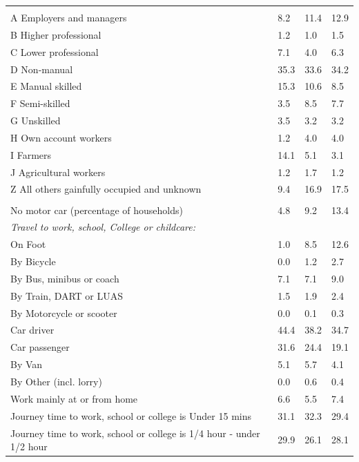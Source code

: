 \documentclass{article}
\begin{document}
\begin{table}[h]
\begin{tabular}{KTTT}
\hline
    \\ 
    \hline
A Employers and managers &  8.2& 11.4& 12.9\\
B Higher professional & 1.2& 1.0& 1.5\\
C Lower professional & 7.1& 4.0& 6.3\\
D Non-manual & 35.3& 33.6& 34.2\\
E Manual skilled & 15.3& 10.6&  8.5\\
F Semi-skilled & 3.5& 8.5& 7.7\\
G Unskilled & 3.5& 3.2& 3.2\\
H Own account workers & 1.2& 4.0& 4.0\\
I Farmers & 14.1&  5.1&  3.1\\
J Agricultural workers & 1.2& 1.7& 1.2\\
Z All others gainfully occupied and unknown &  9.4& 16.9& 17.5\\
\hline
{}\hline
    \\ 
    \hline
No motor car (percentage of households) &  4.8&  9.2& 
13.4\\
    \hline
\emph{Travel to work, school, College or childcare:} & & & \\
\quad On Foot &  1.0&  8.5& 12.6\\
\quad By Bicycle & 0.0& 1.2& 2.7\\
\quad By Bus, minibus or coach & 7.1& 7.1& 9.0\\
\quad By Train, DART or LUAS & 1.5& 1.9& 2.4\\
\quad By Motorcycle or scooter & 0.0& 0.1& 0.3\\
\quad Car driver & 44.4& 38.2& 34.7\\
\quad Car passenger & 31.6& 24.4& 19.1\\
\quad By Van & 5.1& 5.7& 4.1\\
\quad By Other (incl. lorry) & 0.0& 0.6& 0.4\\
    \hline
Work mainly at or from home & 6.6& 5.5& 7.4\\
Journey time to work, school or college is Under 15 mins & 31.1& 32.3& 29.4\\
Journey time to work, school or college is 1/4 hour - under 1/2 hour & 29.9& 26.1& 28.1\\

\end{tabular}
\end{table}
\end{document}
